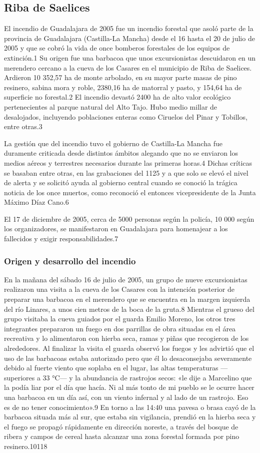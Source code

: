 \subsection{Riba de Saelices}
El incendio de Guadalajara de 2005 fue un incendio forestal que asoló parte de la provincia de Guadalajara (Castilla-La Mancha) desde el 16 hasta el 20 de julio de 2005 y que se cobró la vida de once bomberos forestales de los equipos de extinción.1​ Su origen fue una barbacoa que unos excursionistas descuidaron en un merendero cercano a la cueva de los Casares en el municipio de Riba de Saelices. Ardieron 10 352,57 ha de monte arbolado, en su mayor parte masas de pino resinero, sabina mora y roble, 2380,16 ha de matorral y pasto, y 154,64 ha de superficie no forestal.2​ El incendio devastó 2400 ha de alto valor ecológico pertenecientes al parque natural del Alto Tajo. Hubo medio millar de desalojados, incluyendo poblaciones enteras como Ciruelos del Pinar y Tobillos, entre otras.3​


La gestión que del incendio tuvo el gobierno de Castilla-La Mancha fue duramente criticada desde distintos ámbitos alegando que no se enviaron los medios aéreos y terrestres necesarios durante las primeras horas.4​ Dichas críticas se basaban entre otras, en las grabaciones del 1125​ y a que solo se elevó el nivel de alerta y se solicitó ayuda al gobierno central cuando se conoció la trágica noticia de los once muertos, como reconoció el entonces vicepresidente de la Junta Máximo Díaz Cano.6​


El 17 de diciembre de 2005, cerca de 5000 personas según la policía, 10 000 según los organizadores, se manifestaron en Guadalajara para homenajear a los fallecidos y exigir responsabilidades.7​ 
\subsubsection{Origen y desarrollo del incendio}
En la mañana del sábado 16 de julio de 2005, un grupo de nueve excursionistas realizaron una visita a la cueva de los Casares con la intención posterior de preparar una barbacoa en el merendero que se encuentra en la margen izquierda del río Linares, a unos cien metros de la boca de la gruta.8​ Mientras el grueso del grupo visitaba la cueva guiados por el guarda Emilio Moreno, los otros tres integrantes prepararon un fuego en dos parrillas de obra situadas en el área recreativa y lo alimentaron con hierba seca, ramas y piñas que recogieron de los alrededores. Al finalizar la visita el guarda observó los fuegos y les advirtió que el uso de las barbacoas estaba autorizado pero que él lo desaconsejaba severamente debido al fuerte viento que soplaba en el lugar, las altas temperaturas —superiores a 33 °C— y la abundancia de rastrojos secos: «le dije a Marcelino que la podía liar por el día que hacía. Ni al más tonto de mi pueblo se le ocurre hacer una barbacoa en un día así, con un viento infernal y al lado de un rastrojo. Eso es de no tener conocimiento».9​ En torno a las 14:40 una pavesa o brasa cayó de la barbacoa situada más al sur, que estaba sin vigilancia, prendió en la hierba seca y el fuego se propagó rápidamente en dirección noreste, a través del bosque de ribera y campos de cereal hasta alcanzar una zona forestal formada por pino resinero.10​11​8​


